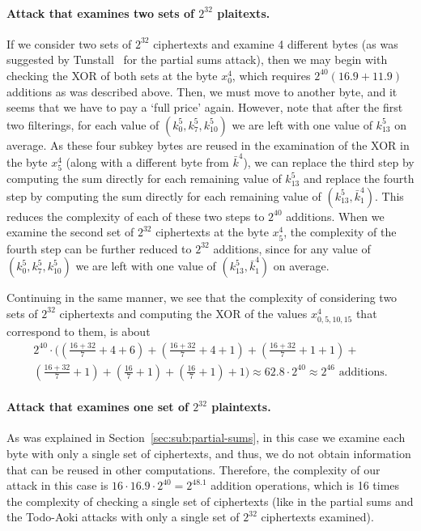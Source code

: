 \paragraph{Attack that examines two sets of $2^{32}$ plaitexts.} If we consider two sets of $2^{32}$ ciphertexts and examine 4 different bytes (as was suggested by Tunstall~\cite{Tunstall12} for the partial sums attack), then we may begin with checking the XOR of both sets at the byte $x^4_{0}$, which requires $2^{40}(16.9+11.9)$ additions as was described above. Then, we must move to another byte, and it seems that we have to pay a `full price' again. However, note that after the first two filterings, for each value of $(k^5_0,k^5_7,k^5_{10})$ we are left with one value of $k^5_{13}$ on average. As these four subkey bytes are reused in the examination of the XOR in the byte $x^4_5$ (along with a different byte from $\bar{k}^4$), we can replace the third step by computing the sum directly for each remaining value of $k^5_{13}$ and replace the fourth step by computing the sum directly for each remaining value of $(k^5_{13},\bar{k}^4_1)$. This reduces the complexity of each of these two steps to $2^{40}$ additions. When we examine the second set of $2^{32}$ ciphertexts at the byte $x^4_5$, the complexity of the fourth step can be further reduced to $2^{32}$ additions, since for any value of $(k^5_0,k^5_7,k^5_{10})$ we are left with one value of $(k^5_{13},\bar{k}^4_1)$ on average.   

Continuing in the same manner, we see that the complexity of considering two sets of $2^{32}$ ciphertexts and computing the XOR of the values $x^4_{0,5,10,15}$ that correspond to them, is about
\[
\begin{gathered}
2^{40}\cdot\Big(\left(\frac{16+32}{7}+4+6\right)+\left(\frac{16+32}{7}+4+1\right)+
\left(\frac{16+32}{7}+1+1\right)+\\ \left(\frac{16+32}{7}+1\right)+
\left(\frac{16}{7}+1\right)+\left(\frac{16}{7}+1\right)+
1\Big) \approx 62.8 \cdot 2^{40} \approx 2^{46} \text{ additions.}
\end{gathered}
\]


\paragraph{Attack that examines one set of $2^{32}$ plaintexts.} As was explained in Section~\ref{sec:sub:partial-sums}, in this case we examine each byte with only a single set of ciphertexts, and thus, we do not obtain information that can be reused in other computations. Therefore, the complexity of our attack in this case is $16 \cdot 16.9 \cdot 2^{40} = 2^{48.1}$ addition operations, which is 16 times the complexity of checking a single set of ciphertexts (like in the partial sums and the Todo-Aoki attacks with only a single set of $2^{32}$ ciphertexts examined). 

